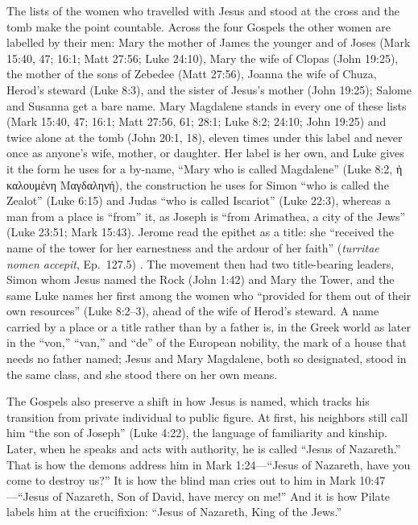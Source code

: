 The lists of the women who travelled with Jesus and stood at the cross and the tomb make the point countable.
Across the four Gospels the other women are labelled by their men: Mary the mother of James the younger and of Joses (Mark 15:40, 47; 16:1; Matt 27:56; Luke 24:10), Mary the wife of Clopas (John 19:25), the mother of the sons of Zebedee (Matt 27:56), Joanna the wife of Chuza, Herod's steward (Luke 8:3), and the sister of Jesus's mother (John 19:25); Salome and Susanna get a bare name.
Mary Magdalene stands in every one of these lists (Mark 15:40, 47; 16:1; Matt 27:56, 61; 28:1; Luke 8:2; 24:10; John 19:25) and twice alone at the tomb (John 20:1, 18), eleven times under this label and never once as anyone's wife, mother, or daughter.
Her label is her own, and Luke gives it the form he uses for a by-name, ``Mary who is called Magdalene'' (Luke 8:2, ἡ καλουμένη Μαγδαληνή), the construction he uses for Simon ``who is called the Zealot'' (Luke 6:15) and Judas ``who is called Iscariot'' (Luke 22:3), whereas a man from a place is ``from'' it, as Joseph is ``from Arimathea, a city of the Jews'' (Luke 23:51; Mark 15:43).
Jerome read the epithet as a title: she ``received the name of the tower for her earnestness and the ardour of her faith'' (\emph{turritae nomen accepit}, Ep.~127.5) \cite{jerome:epistulae}.
The movement then had two title-bearing leaders, Simon whom Jesus named the Rock (John 1:42) and Mary the Tower, and the same Luke names her first among the women who ``provided for them out of their own resources'' (Luke 8:2--3), ahead of the wife of Herod's steward.
A name carried by a place or a title rather than by a father is, in the Greek world as later in the ``von,'' ``van,'' and ``de'' of the European nobility, the mark of a house that needs no father named; Jesus and Mary Magdalene, both so designated, stood in the same class, and she stood there on her own means.

The Gospels also preserve a shift in how Jesus is named, which tracks his transition from private individual to public figure.
At first, his neighbors still call him ``the son of Joseph'' (Luke 4:22), the language of familiarity and kinship.
Later, when he speaks and acts with authority, he is called ``Jesus of Nazareth.''
That is how the demons address him in Mark 1:24---``Jesus of Nazareth, have you come to destroy us?''
It is how the blind man cries out to him in Mark 10:47---``Jesus of Nazareth, Son of David, have mercy on me!''
And it is how Pilate labels him at the crucifixion: ``Jesus of Nazareth, King of the Jews.''

